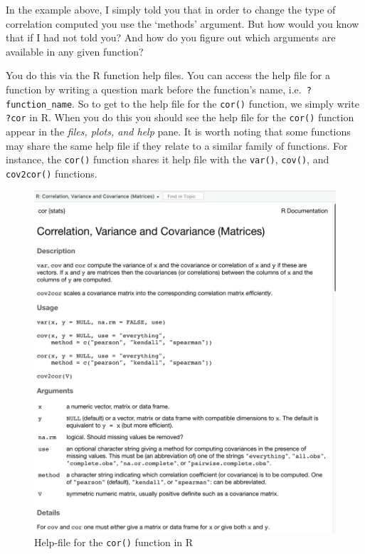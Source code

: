 \documentclass[
]{book}
\begin{document}
In the example above, I simply told you that in order to change the type of correlation computed you use the `methods' argument. But how would you know that if I had not told you? And how do you figure out which arguments are available in any given function?

You do this via the R function help files. You can access the help file for a function by writing a question mark before the function's name, i.e.~\texttt{?function\_name}. So to get to the help file for the \texttt{cor()} function, we simply write \texttt{?cor} in R. When you do this you should see the help file for the \texttt{cor()} function appear in the \emph{files, plots, and help} pane. It is worth noting that some functions may share the same help file if they relate to a similar family of functions. For instance, the \texttt{cor()} function shares it help file with the \texttt{var()}, \texttt{cov()}, and \texttt{cov2cor()} functions.

\begin{figure}
\centering
\includegraphics{figures/help_file.png}
\caption{Help-file for the \texttt{cor()} function in R}
\end{figure}
\end{document}
